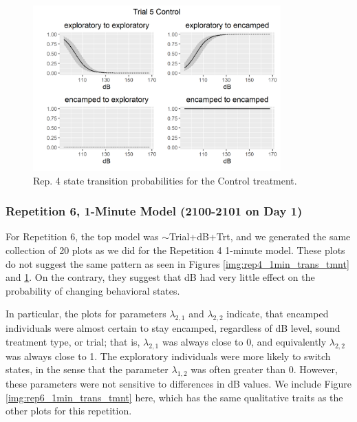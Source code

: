 \documentclass[12pt]{article}
\begin{document}
	\begin{figure}
		\centering
		\includegraphics[width=0.85\textwidth]{trans_rep_4_trial_5_Control.png}
		\caption{Rep. 4 state transition probabilities for the Control treatment.}
		\label{img:rep4_1min_trans_control}
	\end{figure}
	
	\subsubsection{Repetition 6, 1-Minute Model (2100-2101 on Day 1)}
	
	For Repetition 6, the top model was $\sim$Trial+dB+Trt, and we generated the same collection of 20 plots as we did for the Repetition 4 1-minute model. These plots do not suggest the same pattern as seen in Figures \ref{img:rep4_1min_trans_tmnt} and \ref{img:rep4_1min_trans_control}. On the contrary, they suggest that dB had very little effect on the probability of changing behavioral states. 
	
	In particular, the plots for parameters $\lambda_{2, 1}$ and $\lambda_{2, 2}$ indicate, that encamped individuals were almost certain to stay encamped, regardless of dB level, sound treatment type, or trial; that is, $\lambda_{2, 1}$ was always close to 0, and equivalently $\lambda_{2, 2}$ was always close to 1. The exploratory individuals were more likely to switch states, in the sense that the parameter $\lambda_{1, 2}$ was often greater than 0. However, these parameters were not sensitive to differences in dB values. We include Figure \ref{img:rep6_1min_trans_tmnt} here, which has the same qualitative traits as the other plots for this repetition.
	
\end{document}
